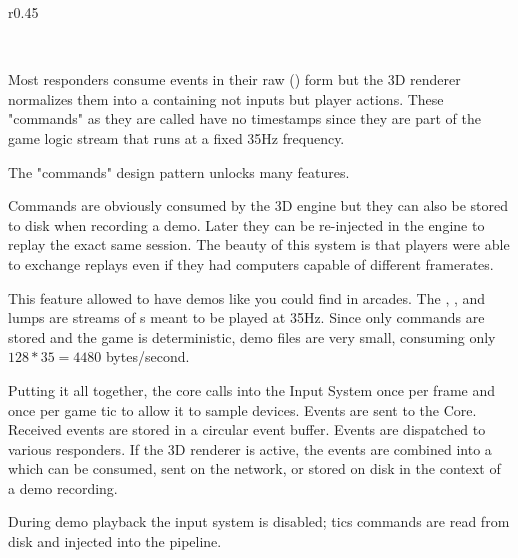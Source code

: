 \begin{wrapfigure}[12]{r}{0.45\textwidth}
\centering
{}
\end{wrapfigure}
\\
\par
Most responders consume events in their raw () form but the 3D renderer normalizes them into a  containing not inputs but player actions. These "commands" as they are called have no timestamps since they are part of the game logic stream that runs at a fixed 35Hz frequency. \\
\par
{} \label{cmd_t_type}
\par
The "commands" design pattern unlocks many features. \\
\par
Commands are obviously consumed by the 3D engine but they can also be stored to disk when recording a demo. Later they can be re-injected in the engine to replay the exact same session. The beauty of this system is that players were able to exchange replays even if they had computers capable of different framerates.\\
\par
This feature allowed \doom{} to have demos like you could find in arcades. The , , and  lumps are streams of s meant to be played at 35Hz. Since only commands are stored and the game is deterministic, demo files are very small, consuming only $ 128 * 35 = 4480 $ bytes/second.\\

\par
Putting it all together,  the core calls into the Input System once per frame and once per game tic to allow it to sample devices.  Events are sent to the Core.  Received events are stored in a circular event buffer.  Events are dispatched to various responders. If the 3D renderer is active, the events are combined into a  which can be consumed, sent on the network, or stored on disk in the context of a demo recording.\\
\par
 During demo playback the input system is disabled; tics commands are read from disk and injected into the pipeline.
